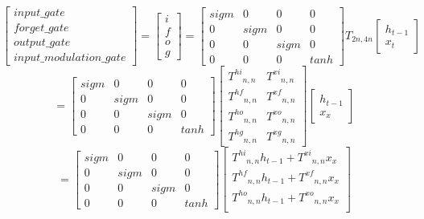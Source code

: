\documentclass[draft,dvipsnames]{drexel-thesis}
\begin{document}
\begin{thesis}
\begin{enumerate}
\begin{enumerate}
\[
\begin{bmatrix}
    input\_gate \\
    forget\_gate \\
    output\_gate \\
    input\_modulation\_gate
\end{bmatrix}
=
\begin{bmatrix}
    i \\
    f \\
    o \\
    g
\end{bmatrix}
=
\begin{bmatrix}
    sigm & 0 & 0 & 0\\
    0 & sigm & 0 & 0\\
    0 & 0 & sigm & 0\\
    0 & 0 & 0 & tanh
\end{bmatrix}
T_{2n,4n}
\begin{bmatrix}
    h_{t-1} \\
    x_{t}
\end{bmatrix}
\]
\[
=
\begin{bmatrix}
    sigm & 0 & 0 & 0\\
    0 & sigm & 0 & 0\\
    0 & 0 & sigm & 0\\
    0 & 0 & 0 & tanh
\end{bmatrix}
\begin{bmatrix}
    {T^{hi}}_{n,n} & {T^{xi}}_{n,n} \\
    {T^{hf}}_{n,n} & {T^{xf}}_{n,n} \\
    {T^{ho}}_{n,n} & {T^{xo}}_{n,n} \\
    {T^{hg}}_{n,n} & {T^{xg}}_{n,n}
\end{bmatrix}
\begin{bmatrix}
    h_{t-1} \\
    x_{x}
\end{bmatrix}
\]
\[
=
\begin{bmatrix}
    sigm & 0 & 0 & 0\\
    0 & sigm & 0 & 0\\
    0 & 0 & sigm & 0\\
    0 & 0 & 0 & tanh
\end{bmatrix}
\begin{bmatrix}
    {T^{hi}}_{n,n}h_{t-1} + {T^{xi}}_{n,n}x_{x} \\
    {T^{hf}}_{n,n}h_{t-1} + {T^{xf}}_{n,n}x_{x} \\
    {T^{ho}}_{n,n}h_{t-1} + {T^{xo}}_{n,n}x_{x} \\

\end{bmatrix}\]
\end{enumerate}
\end{enumerate}
\end{thesis}
\end{document}
